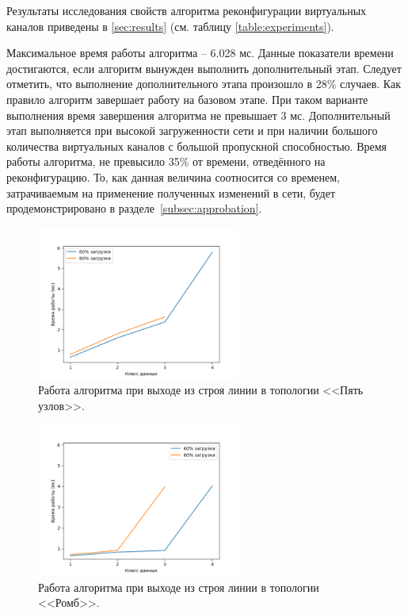 \documentclass[12pt, a4paper]{article}
\begin{document}
Результаты исследования свойств алгоритма реконфигурации виртуальных каналов приведены в \ref{sec:results} (см. таблицу \ref{table:experiments}).

Максимальное время работы алгоритма – 6.028 мс. Данные показатели времени достигаются, если алгоритм вынужден выполнить дополнительный этап. Следует отметить, что выполнение дополнительного этапа произошло в 28\% случаев. Как правило алгоритм завершает работу на базовом этапе. При таком варианте выполнения время завершения алгоритма не превышает 3 мс. Дополнительный этап выполняется при высокой загруженности сети и при наличии большого количества виртуальных каналов с большой пропускной способностью. Время работы алгоритма, не превысило 35\% от времени, отведённого на реконфигурацию. То, как данная величина соотносится со временем, затрачиваемым на применение полученных изменений в сети, будет продемонстрировано в разделе~\ref{subsec:approbation}.

\begin{figure}[h!]
	\centering
	\includegraphics[width=0.60\textwidth]{img/5node_res.png}
	\caption{Работа алгоритма при выходе из строя линии в топологии <<Пять узлов>>.}
	\label{pic:5node_res}
\end{figure}

\begin{figure}[h!]
	\centering
	\includegraphics[width=0.60\textwidth]{img/4node_res.png}
	\caption{Работа алгоритма при выходе из строя линии в топологии <<Ромб>>.}
	\label{pic:4node_res}
\end{figure}
\end{document}
